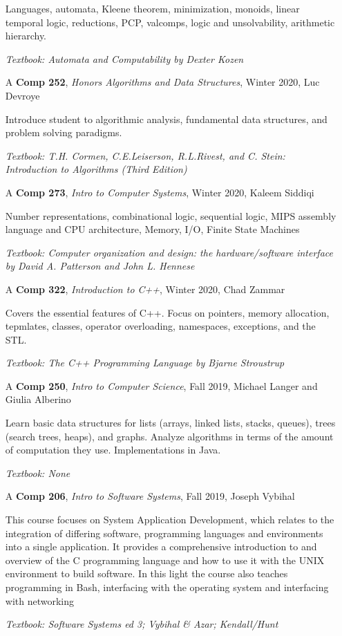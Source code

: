 \documentclass{scrartcl}
\begin{document}
\begin{itemize}
    Languages, automata, Kleene theorem, minimization, monoids, linear temporal logic, reductions, PCP, valcomps, logic and unsolvability, arithmetic hierarchy.

    \textit{\small Textbook: Automata and Computability by Dexter Kozen}
  \item[A] \textbf{Comp 252}, \textit{Honors Algorithms and Data Structures},
    Winter 2020, Luc Devroye

    Introduce student to algorithmic analysis, fundamental data structures, and
    problem solving paradigms.

    \textit{\small Textbook: T.H. Cormen, C.E.Leiserson, R.L.Rivest, and C. Stein: Introduction to Algorithms (Third Edition)}

  \item[A] \textbf{Comp 273}, \textit{Intro to Computer Systems},
    Winter 2020, Kaleem Siddiqi

    Number representations, combinational logic, sequential logic, MIPS assembly
    language and CPU architecture, Memory, I/O, Finite State Machines

    \textit{\small Textbook: Computer organization and design: the
      hardware/software interface by David A. Patterson and John L. Hennese}
    
  \item[A] \textbf{Comp 322}, \textit{Introduction to C++}, Winter 2020, Chad
    Zammar

    Covers the essential features of C++. Focus on pointers, memory
    allocation, tepmlates, classes, operator overloading, namespaces,
    exceptions, and the STL.

    \textit{\small Textbook: The C++ Programming Language by Bjarne Stroustrup}

  \item[A] \textbf{Comp 250}, \textit{Intro to Computer Science}, Fall 2019, Michael Langer and Giulia Alberino
  
  Learn  basic  data  structures  for  lists  (arrays,  linked  lists,  stacks,  queues),  trees  (search trees, heaps), and graphs. Analyze algorithms in terms of the amount of computation they use. Implementations in Java.
  
  \textit{\small Textbook: None}

  \item[A] \textbf{Comp 206}, \textit{Intro to Software Systems}, Fall 2019, Joseph Vybihal
  
  This course focuses on System Application Development, which relates to the integration of differing software, programming languages and environments into a single application. It provides a comprehensive introduction to and overview of the C programming language and how to use it with the UNIX environment to build software. In this light the course also teaches programming in Bash, interfacing with the operating system and interfacing with networking
  
  \textit{\small Textbook: Software Systems ed 3; Vybihal \& Azar; Kendall/Hunt}
\end{itemize} 
\end{document}
